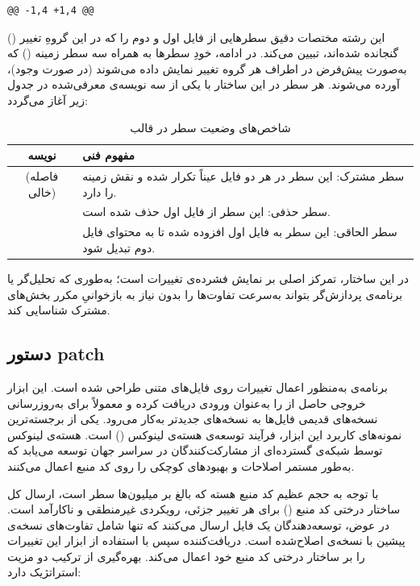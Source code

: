\begin{latin}
\begin{lstlisting}
@@ -1,4 +1,4 @@
\end{lstlisting}
\end{latin}

این رشته مختصات دقیق سطرهایی از فایل اول و دوم را که در این گروهِ تغییر () گنجانده شده‌اند، تبیین می‌کند. در ادامه، خودِ سطرها به همراه سه سطر زمینه () که به‌صورت پیش‌فرض در اطراف هر گروه تغییر نمایش داده می‌شوند (در صورت وجود)، آورده می‌شوند. هر سطر در این ساختار با یکی از سه نویسه‌ی معرفی‌شده در جدول زیر آغاز می‌گردد:

\begin{table}[htbp]
\centering
\caption{شاخص‌های وضعیت سطر در قالب }
\label{tab:unified-markers}
\begin{tabularx}{\textwidth}{c X}
\toprule
\textbf{نویسه} & \textbf{مفهوم فنی} \\
\midrule
(فاصله خالی) & سطر مشترک: این سطر در هر دو فایل عیناً تکرار شده و نقش زمینه را دارد. \\
\addlinespace
\cmd{-} & سطر حذفی: این سطر از فایل اول حذف شده است. \\
\addlinespace
\cmd{+} & سطر الحاقی: این سطر به فایل اول افزوده شده تا به محتوای فایل دوم تبدیل شود. \\
\bottomrule
\end{tabularx}
\end{table}

در این ساختار، تمرکز اصلی بر نمایش فشرده‌ی تغییرات است؛ به‌طوری که تحلیل‌گر یا برنامه‌ی پردازش‌گر بتواند به‌سرعت تفاوت‌ها را بدون نیاز به بازخوانیِ مکرر بخش‌های مشترک شناسایی کند.

\subsection{دستور patch}

برنامه‌ی  به‌منظور اعمال تغییرات روی فایل‌های متنی طراحی شده است. این ابزار خروجی حاصل از  را به‌عنوان ورودی دریافت کرده و معمولاً برای به‌روزرسانی نسخه‌های قدیمی فایل‌ها به نسخه‌های جدیدتر به‌کار می‌رود. یکی از برجسته‌ترین نمونه‌های کاربرد این ابزار، فرآیند توسعه‌ی هسته‌ی لینوکس () است. هسته‌ی لینوکس توسط شبکه‌ی گسترده‌ای از مشارکت‌کنندگان در سراسر جهان توسعه می‌یابد که به‌طور مستمر اصلاحات و بهبودهای کوچکی را روی کد منبع اعمال می‌کنند.

با توجه به حجم عظیم کد منبع هسته که بالغ بر میلیون‌ها سطر است، ارسال کل ساختار درختی کد منبع () برای هر تغییر جزئی، رویکردی غیرمنطقی و ناکارآمد است. در عوض، توسعه‌دهندگان یک فایل  ارسال می‌کنند که تنها شامل تفاوت‌های نسخه‌ی پیشین با نسخه‌ی اصلاح‌شده است. دریافت‌کننده سپس با استفاده از ابزار  این تغییرات را بر ساختار درختی کد منبع خود اعمال می‌کند. بهره‌گیری از ترکیب  دو مزیت استراتژیک دارد:

